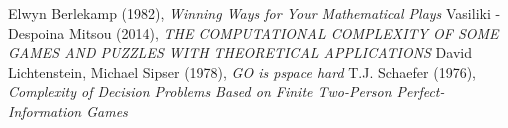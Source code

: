 \documentclass{article}
\begin{document}
\begin{thebibliography}{}
\bibitem{}
Elwyn Berlekamp (1982), \emph{Winning Ways for Your Mathematical Plays}
\bibitem{}
Vasiliki - Despoina Mitsou (2014), \emph{THE COMPUTATIONAL COMPLEXITY
OF SOME GAMES AND PUZZLES
WITH THEORETICAL APPLICATIONS}
\bibitem{}
David Lichtenstein, Michael Sipser (1978), \emph{GO is pspace hard}
\bibitem{}
T.J. Schaefer (1976), \emph{Complexity of Decision Problems
Based on Finite Two-Person Perfect-Information
Games}
\end{thebibliography}
\end{document}
